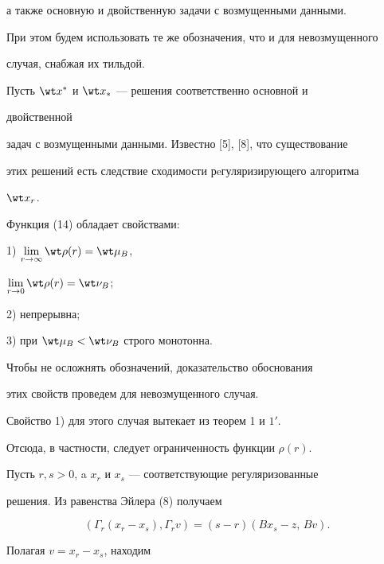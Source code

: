 а также основную и двойственную задачи с возмущенными данными.  


При этом будем использовать те же обозначения, что и для невозмущенного 


случая, снабжая их тильдой. 


 


Пусть $\wt x^*$ и $\wt x_*$ --- решения соответственно основной и 


двойственной  


задач с возмущенными данными. Известно [5], [8], что существование  


этих решений есть следствие сходимости рeгуляризирующего алгоритма 


$\wt x_r$. 


 


Функция (14) обладает свойствами: 


 


1) $\lim\limits_{r\to\infty}\wt\rho(r)=\wt\mu_B$, 


$\lim\limits_{r\to0}\wt\rho(r)=\wt\nu_B$; 


 


2) непрерывна;


 


3) при $\wt\mu_B<\wt\nu_B$ строго монотонна. 


 


Чтобы не осложнять обозначений, доказательство обоснования 


этих свойств проведем для невозмущенного случая.  


Свойство 1) для этого случая вытекает из теорем 1 и $1'$.  


Отсюда, в частности, следует ограниченность функции $\rho(r)$.  


Пусть $r,s>0$, a $x_r$ и $x_s$ --- соответствующие регуляризованные  


решения. Из равенства Эйлера (8) получаем 


\begin{equation} 


(\Gamma_r(x_r-x_s),\Gamma_r v)=(s-r)(B x_s-z,\,B v). 


\end{equation} 


Полагая $v=x_r-x_s$, находим 



